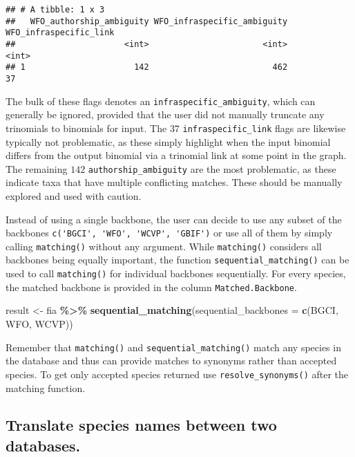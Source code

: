 \documentclass[
  11pt,
]{article}
\newenvironment{Shaded}{\begin{snugshade}}{\end{snugshade}}
\newcommand{\AttributeTok}[1]{\textcolor[rgb]{0.13,0.29,0.53}{#1}}
\newcommand{\FunctionTok}[1]{\textcolor[rgb]{0.13,0.29,0.53}{\textbf{#1}}}
\newcommand{\NormalTok}[1]{#1}
\newcommand{\OtherTok}[1]{\textcolor[rgb]{0.56,0.35,0.01}{#1}}
\newcommand{\SpecialCharTok}[1]{\textcolor[rgb]{0.81,0.36,0.00}{\textbf{#1}}}
\newcommand{\StringTok}[1]{\textcolor[rgb]{0.31,0.60,0.02}{#1}}
\begin{document}
\begin{verbatim}
## # A tibble: 1 x 3
##   WFO_authorship_ambiguity WFO_infraspecific_ambiguity WFO_infraspecific_link
##                      <int>                       <int>                  <int>
## 1                      142                         462                     37
\end{verbatim}

The bulk of these flags denotes an \verb|infraspecific_ambiguity|, which
can generally be ignored, provided that the user did not manually
truncate any trinomials to binomials for input. The \(37\)
\verb|infraspecific_link| flags are likewise typically not problematic,
as these simply highlight when the input binomial differs from the
output binomial via a trinomial link at some point in the graph. The
remaining \(142\) \verb|authorship_ambiguity| are the most problematic,
as these indicate taxa that have multiple conflicting matches. These
should be manually explored and used with caution.

\noindent Instead of using a single backbone, the user can decide to use
any subset of the backbones \verb|c('BGCI', 'WFO', 'WCVP', 'GBIF')| or
use all of them by simply calling \verb|matching()| without any
argument. While \verb|matching()| considers all backbones being equally
important, the function \verb|sequential_matching()| can be used to call
\verb|matching()| for individual backbones sequentially. For every
species, the matched backbone is provided in the column
\verb|Matched.Backbone|.

\begin{Shaded}
\begin{Highlighting}[]
\NormalTok{result }\OtherTok{\textless{}{-}}\NormalTok{ fia }\SpecialCharTok{\%\textgreater{}\%} 
  \FunctionTok{sequential\_matching}\NormalTok{(}\AttributeTok{sequential\_backbones =} \FunctionTok{c}\NormalTok{(}\StringTok{\textquotesingle{}BGCI\textquotesingle{}}\NormalTok{, }\StringTok{\textquotesingle{}WFO\textquotesingle{}}\NormalTok{, }\StringTok{\textquotesingle{}WCVP\textquotesingle{}}\NormalTok{))}
\end{Highlighting}
\end{Shaded}

\noindent Remember that \verb|matching()| and
\verb|sequential_matching()| match any species in the database and thus
can provide matches to synonyms rather than accepted species. To get
only accepted species returned use \verb|resolve_synonyms()| after the
matching function.

\hypertarget{translate-species-names-between-two-databases.}{%
\subsection{Translate species names between two
databases.}\label{translate-species-names-between-two-databases.}}
\end{document}
